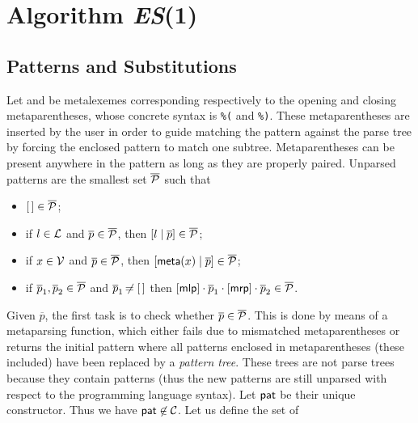 
\section{Algorithm \textit{ES}(1)}
\label{es1}

\subsection{Patterns and Substitutions}

Let \mlp and \mrp be meta\-lexemes corresponding respectively to the
opening and closing meta\-parentheses, whose concrete syntax is
\texttt{\%(} and \texttt{\%)}. These meta\-parentheses are inserted by
the user in order to guide matching the pattern against the parse tree
by forcing the enclosed pattern to match one
subtree. Meta\-parentheses can be present anywhere in the pattern as
long as they are properly paired. Unparsed patterns are the smallest
set \(\overline{\cal P}\) such that
\begin{itemize}

  \item \(\el \in \overline{\cal P}\);

  \item if \(l \in {\cal L}\) and \(\overline{p} \in \overline{\cal
    P}\), then \(\cons{l}{\overline{p}} \in \overline{\cal P}\);

  \item if \(x \in {\cal V}\) and \(\overline{p} \in \overline{\cal
    P}\), then \(\cons{\meta{x}}{\overline{p}} \in \overline{\cal
    P}\);

  \item if \(\overline{p}_1, \overline{p}_2 \in \overline{\cal P}\)
    and \(\overline{p}_1 \not\nobreak\mkern -2mu = [\,]\) then \([\mlp] \cdot \overline{p}_1
    \cdot [\mrp] \cdot \overline{p}_2 \in \overline{\cal P}\). 

\end{itemize}
Given \(\overline{p}\), the first task is to check whether
\(\overline{p} \in \overline{\cal P}\). This is done by means of a
meta\-parsing function, which either fails due to
mismatched meta\-parentheses or returns the initial pattern where all
patterns enclosed in meta\-parentheses (these included) have been
replaced by a \emph{pattern tree}. These trees are not parse trees
because they contain patterns (thus the new patterns are still
unparsed with respect to the programming language syntax). Let
\(\textsf{pat}\) be their unique constructor. Thus we have
\(\unary{pat} \not\in {\cal C}\). Let us define the set of
